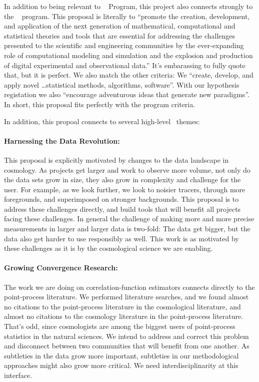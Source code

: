\documentclass[12pt, fullpage, letterpaper]{article}
\begin{document}
In addition to being relevant to \NSF\  Program, this
project also connects strongly to the \NSF\ 
program. This proposal is literally to ``promote the creation,
development, and application of the next generation of mathematical,
computational and statistical theories and tools that are essential
for addressing the challenges presented to the scientific and
engineering communities by the ever-expanding role of computational
modeling and simulation and the explosion and production of digital
experimental and observational data.'' It's embarassing to fully quote
that, but it is perfect. We also match the other  criteria:
We ``create, develop, and apply novel \ldots statistical methods, algorithms, software''.
With our hypothesis registation we also ``encourage adventurous ideas that generate
new paradigms''. In short, this proposal fits perfectly with the  program
criteria.

In addition, this propoal connects to several high-level \NSF\ themes:

\paragraph{Harnessing the Data Revolution:}
This proposal is explicitly motivated by changes to the data landscape
in cosmology.  As projects get larger and work to observe more volume,
not only do the data sets grow in size, they also grow in complexity
and challenge for the user.  For example, as we look further, we look
to noisier tracers, through more foregrounds, and superimposed on
stronger backgrounds. This proposal is to address these challenges
directly, and build tools that will benefit all projects facing these
challenges.  In general the challenge of making more and more precise
measurements in larger and larger data is two-fold: The data get
bigger, but the data also get harder to use responsibly as well. This
work is as motivated by these challenges as it is by the cosmological
science we are enabling.

\paragraph{Growing Convergence Research:}
The work we are doing on correlation-function estimators connects
directly to the point-process literature. We performed literature
searches, and we found almost no citations to the point-process
literature in the cosmological literature, and almost no citations to
the cosmology literature in the point-process literature. That's odd,
since cosmologists are among the biggest users of point-process
statistics in the natural sciences. We intend to address and correct
this problem and disconnect between two communities that will benefit
from one another. As subtleties in the data grow more important,
subtleties in our methodological approaches might also grow more
critical. We need interdisciplinarity at this interface.
\end{document}
